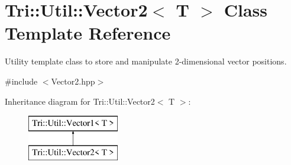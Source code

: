 \hypertarget{class_tri_1_1_util_1_1_vector2}{}\section{Tri\+:\+:Util\+:\+:Vector2$<$ T $>$ Class Template Reference}
\label{class_tri_1_1_util_1_1_vector2}


Utility template class to store and manipulate 2-\/dimensional vector positions.  




{\ttfamily \#include $<$Vector2.\+hpp$>$}

Inheritance diagram for Tri\+:\+:Util\+:\+:Vector2$<$ T $>$\+:\begin{figure}[H]
\begin{center}
\leavevmode
\includegraphics[height=2.000000cm]{class_tri_1_1_util_1_1_vector2}
\end{center}
\end{figure}
